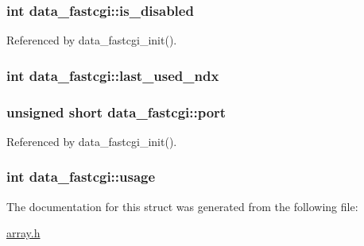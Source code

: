 \hypertarget{structdata__fastcgi_a8af0f68ddb6b19b086c1de9e1a1deb39}{
\subsubsection[{is\-\_\-disabled}]{\setlength{\rightskip}{0pt plus 5cm}int data\-\_\-fastcgi\-::is\-\_\-disabled}}\label{structdata__fastcgi_a8af0f68ddb6b19b086c1de9e1a1deb39}


Referenced by data\-\_\-fastcgi\-\_\-init().

\hypertarget{structdata__fastcgi_a6c8fac945c763d170a8fef3a7d0c17d1}{
\subsubsection[{last\-\_\-used\-\_\-ndx}]{\setlength{\rightskip}{0pt plus 5cm}int data\-\_\-fastcgi\-::last\-\_\-used\-\_\-ndx}}\label{structdata__fastcgi_a6c8fac945c763d170a8fef3a7d0c17d1}
\hypertarget{structdata__fastcgi_acbac078b7f6df440c94faf4ff376cca0}{
\subsubsection[{port}]{\setlength{\rightskip}{0pt plus 5cm}unsigned short data\-\_\-fastcgi\-::port}}\label{structdata__fastcgi_acbac078b7f6df440c94faf4ff376cca0}


Referenced by data\-\_\-fastcgi\-\_\-init().

\hypertarget{structdata__fastcgi_adac3f92f8340f637ac74b5c0067f078c}{
\subsubsection[{usage}]{\setlength{\rightskip}{0pt plus 5cm}int data\-\_\-fastcgi\-::usage}}\label{structdata__fastcgi_adac3f92f8340f637ac74b5c0067f078c}


The documentation for this struct was generated from the following file\-:\begin{DoxyCompactItemize}
\item 
\hyperlink{array_8h}{array.\-h}\end{DoxyCompactItemize}
